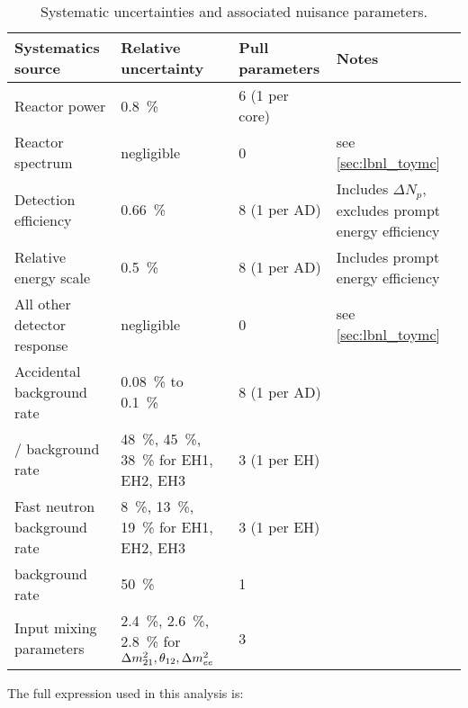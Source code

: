 \begin{table}[ht]
    \centering
    \footnotesize
    \begin{tabular}[t]{lp{3.3cm}lp{3.8cm}}
        \toprule
        Systematics source & Relative uncertainty
                          & Pull parameters
                          & Notes\\
        \midrule
        Reactor power & \SI{0.8}{\percent}
                      & 6 (1 per core) & \\
        Reactor spectrum & negligible
                         & 0
                         & see \cref{sec:lbnl_toymc} \\
        Detection efficiency & \SI{0.66}{\percent}
                             & 8 (1 per AD)
                             & Includes $\Delta N_p$, excludes prompt energy efficiency \\
        Relative energy scale & \SI{0.5}{\percent}
                              & 8 (1 per AD) & Includes prompt energy efficiency \\
        All other detector response & negligible
                                    & 0
                                    & see \cref{sec:lbnl_toymc} \\
        Accidental background rate & \SI{0.08}{\percent} to \SI{0.1}{\percent}
                                   & 8 (1 per AD)
                                   & \\
        \li{}/\he{} background rate &
        \SI{48}{\percent}, \SI{45}{\percent}, \SI{38}{\percent} for EH1, EH2, EH3
                                    & 3 (1 per EH) & \\
        Fast neutron background rate &
        \SI{8}{\percent}, \SI{13}{\percent}, \SI{19}{\percent} for EH1, EH2, EH3
                                     & 3 (1 per EH) & \\
        \amc{} background rate & \SI{50}{\percent}
                             & 1 & \\
        Input mixing parameters &
        \SI{2.4}{\percent}, \SI{2.6}{\percent}, \SI{2.8}{\percent} for
        $\Delta m^2_{21},\theta_{12}, \Delta m^2_{ee}$
                                & 3
                                & \\
        \bottomrule
    \end{tabular}
    \caption{Systematic uncertainties and associated nuisance parameters.}
    \label{tab:systs}
\end{table}

The full \chisquare{} expression used in this analysis is:

